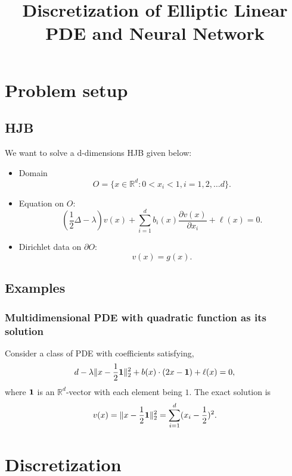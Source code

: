 \documentclass[11pt]{amsart}
\title{Discretization of Elliptic Linear PDE and Neural Network}
\begin{document}
\maketitle

\section{Problem setup}
\subsection{HJB}
We want to solve a d-dimensions HJB given below:
\begin{itemize}
 \item Domain 
 $$O = \{x\in \mathbb R^{d}: 0<x_{i}< 1, i =1,2, \ldots d\}.$$
 \item Equation on $O$: 
 $$(\frac 1 2 \Delta -  \lambda) v(x) + 
 \sum_{i=1}^db_i(x)  \frac{\partial v(x)}{\partial x_i}  
  + \ell(x) = 0.$$
 \item Dirichlet data on $\partial O$:
 $$v(x) = g(x).$$
\end{itemize}

\subsection{Examples} 

\subsubsection{Multidimensional PDE with quadratic function as its solution}
Consider a class of PDE with coefficients satisfying,
$$d - \lambda \|x - \frac 1 2 {\bf 1}\|_{2}^{2} 
+ b(x)\cdot (2x - {\bf 1})+ \ell(x) = 0,$$
where ${\bf 1}$ is an $\mathbb R^{d}$-vector with each element being $1$.
The exact solution is 
$$
v(x) = \|x - \frac 1 2 {\bf 1}\|_{2}^{2} = \sum_{i=1}^{d} (x_{i} - \frac 1 2)^{2}.
$$

\section{Discretization}
\end{document}
